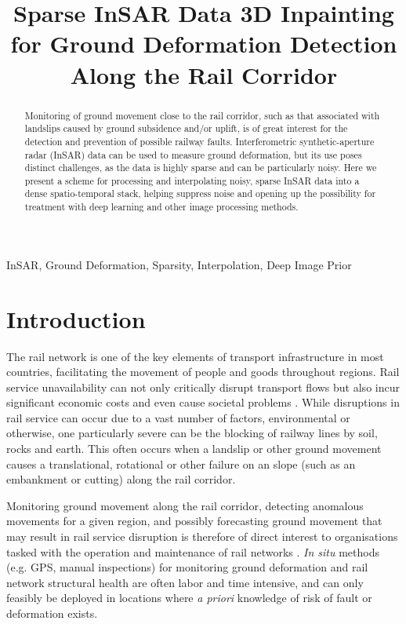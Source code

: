 \documentclass{article}
\title{Sparse InSAR Data 3D Inpainting for Ground Deformation Detection Along the Rail Corridor}
\begin{document}
%
\maketitle
%
\begin{abstract}
Monitoring of ground movement close to the rail corridor, such as that associated with landslips caused by ground subsidence and/or uplift, is of great interest for the detection and prevention of possible railway faults. Interferometric synthetic-aperture radar (InSAR) data can be used to measure ground deformation, but its use poses distinct challenges, as the data is highly sparse and can be particularly noisy. Here we present a scheme for processing and interpolating noisy, sparse InSAR data into a dense spatio-temporal stack, helping suppress noise and opening up the possibility for treatment with deep learning and other image processing methods. 
\end{abstract}
%
\begin{keywords}
InSAR, Ground Deformation, Sparsity, Interpolation, Deep Image Prior
\end{keywords}
%
\section{Introduction}
\label{sec:intro}

The rail network is one of the key elements of transport infrastructure in most countries, facilitating the movement of people and goods throughout regions. Rail service unavailability can not only critically disrupt transport flows but also incur significant economic costs and even cause societal problems \cite{WOODBURN}. While disruptions in rail service can occur due to a vast number of factors, environmental or otherwise, one particularly severe can be the blocking of railway lines by soil, rocks and earth. This often occurs when a landslip or other ground movement causes a translational, rotational or other failure on an slope (such as an embankment or cutting) along the rail corridor. %

Monitoring ground movement along the rail corridor, detecting anomalous movements for a given region, and possibly forecasting ground movement that may result in rail service disruption is therefore of direct interest to organisations tasked with the operation and maintenance of rail networks \cite{CHANG}. \textit{In situ} methods (e.g. GPS, manual inspections) for monitoring ground deformation and rail network structural health are often labor and time intensive, and can only feasibly be deployed in locations where \textit{a priori} knowledge of risk of fault or deformation exists. 
\end{document}
